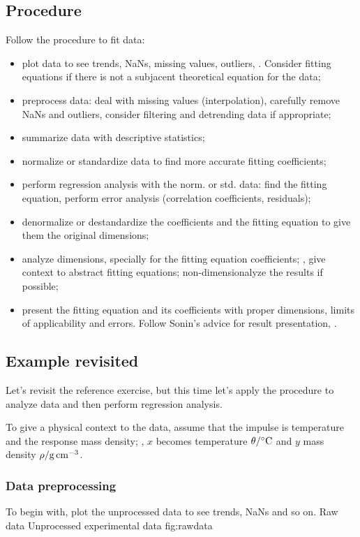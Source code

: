 \subsection*{Procedure}
%
Follow the procedure to fit data:
%
\begin{itemize}
%
\item plot data to see trends, NaNs, missing values, outliers, \etc. Consider fitting equations if there is not a subjacent theoretical equation for the data;
%
\item preprocess data: deal with missing values (interpolation), carefully remove NaNs and outliers, consider filtering and detrending data if appropriate;
%
\item summarize data with descriptive statistics;
%
\item normalize or standardize data to find more accurate fitting coefficients;
%
\item perform regression analysis with the norm. or std. data: find the fitting equation, perform error analysis (correlation coefficients, residuals);
%
\item denormalize or destandardize the coefficients and the fitting equation to give them the original dimensions;
%
\item analyze dimensions, specially for the fitting equation coefficients; \ie, give context to abstract fitting equations; non-dimensionalyze the results if possible;
%
\item present the fitting equation and its coefficients with proper dimensions, limits of applicability and errors. Follow Sonin's advice for result presentation, \cite[p. 23]{sonin:2001}.
%
\end{itemize}


\subsection*{Example revisited}
%
Let's revisit the reference exercise, but this time let's apply the procedure to analyze data and then perform regression analysis. 

To give a physical context to the data, assume that the impulse is temperature and the response mass density; \ie, $x$ becomes temperature $\temp/\si{\celsius}$ and $y$ mass density $\dens/\si{g.cm^{-3}}$.


\subsubsection*{Data preprocessing}
%
To begin with, plot the unprocessed data to see trends, NaNs and so on.
%
%
   {Raw data}%
   {Unprocessed experimental data}%
   {fig:rawdata}%
%

